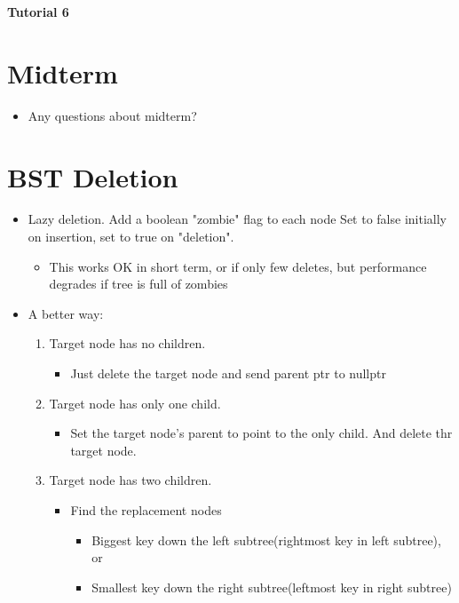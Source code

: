 \documentclass[12pt]{article}
\begin{document}
    
\begin{center}
    \textbf{\huge Tutorial 6}
\end{center}
\section{Midterm}
\begin{itemize}
    \item Any questions about midterm?
\end{itemize}
\section{BST Deletion}
\begin{itemize}
    \item Lazy deletion. Add a boolean "zombie" flag to each node 
    Set to false initially on insertion, set to true on "deletion".
    \begin{itemize}
        \item This works OK in short term, or if only few deletes, but
        performance degrades if tree is full of zombies
    \end{itemize}
    \item A better way:
    \begin{enumerate}
        \item Target node has no children.
        \begin{itemize}
            \item Just delete the target node and send parent ptr to nullptr 
        \end{itemize}
        \item Target node has only one child.
        \begin{itemize}
            \item Set the target node's parent to point to the only child. And delete thr target node.
        \end{itemize}
        \item Target node has two children.
        \begin{itemize}
            \item Find the replacement nodes
            \begin{itemize}
                \item Biggest key down the left subtree(rightmost key in left subtree), or 
                \item Smallest key down the right subtree(leftmost key in right subtree)
            \end{itemize}

\end{itemize}
\end{enumerate}
\end{itemize}
\end{document}
